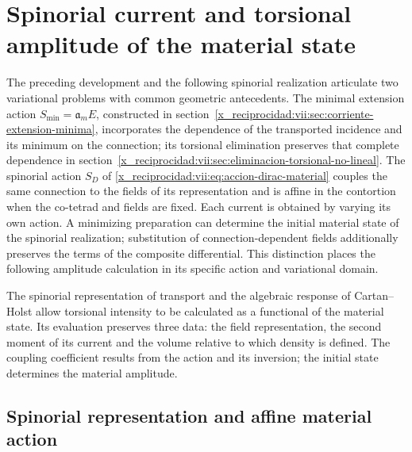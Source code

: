 \chapter{Spinorial current and torsional amplitude of the material state}
\label{x_reciprocidad:vii:sec:corriente-espinorial-densidad}

The preceding development and the following spinorial realization articulate
two variational problems with common geometric antecedents. The
minimal extension action \(S_{\min}=\mathfrak a_m E\), constructed in
section~\ref{x_reciprocidad:vii:sec:corriente-extension-minima}, incorporates the
dependence of the transported incidence and its minimum on the
connection; its torsional elimination preserves that complete dependence in
section~\ref{x_reciprocidad:vii:sec:eliminacion-torsional-no-lineal}. The spinorial
action \(S_D\) of \eqref{x_reciprocidad:vii:eq:accion-dirac-material} couples the
same connection to the fields of its representation and is affine in the
contortion when the co-tetrad and fields are fixed. Each current is obtained
by varying its own action. A minimizing preparation can determine
the initial material state of the spinorial realization; substitution
of connection-dependent fields additionally preserves the terms
of the composite differential. This distinction places the following amplitude
calculation in its specific action and variational domain.

The spinorial representation of transport and the algebraic response
of Cartan--Holst allow torsional intensity to be calculated as a
functional of the material state. Its evaluation preserves three data:
the field representation, the second moment of its current and
the volume relative to which density is defined. The coupling
coefficient results from the action and its inversion; the initial state
determines the material amplitude.

\section{Spinorial representation and affine material action}
\label{x_reciprocidad:vii:subsec:accion-espinorial-afin}

